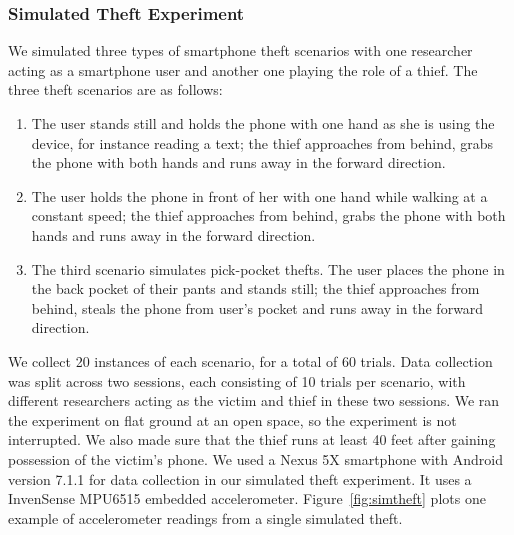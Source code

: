 \subsubsection{Simulated Theft Experiment}
We simulated three types of smartphone theft scenarios with one researcher acting as a smartphone user and another one playing the role of a thief. 
The three theft scenarios are as follows:
\begin{enumerate}
\item The user stands still and holds the phone with one hand as she is using the device, for instance reading a text; the thief approaches from behind, grabs the phone with both hands and runs away in the forward direction. 
\item The user holds the phone in front of her with one hand while walking at a constant speed; the thief approaches from behind, grabs the phone with both hands and runs away in the forward direction. 
\item The third scenario simulates pick-pocket thefts. The user places the phone in the back pocket of their pants and stands still; the thief approaches from behind, steals the phone from user's pocket and runs away in the forward direction.
\end{enumerate}
We collect 20 instances of each scenario, for a total of 60 trials. 
Data collection was split across two sessions, each consisting of 10 trials per scenario, with different researchers acting as the victim and thief in these two sessions. 
We ran the experiment on flat ground at an open space, so the experiment is not interrupted. 
We also made sure that the thief runs at least 40 feet after gaining possession of the victim's phone.
We used a Nexus 5X smartphone with Android version 7.1.1 for data collection in our simulated theft experiment. 
It uses a InvenSense MPU6515 embedded accelerometer.
Figure~\ref{fig:simtheft} plots one example of accelerometer readings from a single simulated theft.


